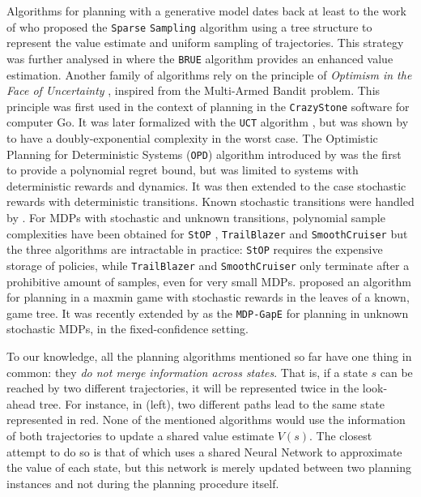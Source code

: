 \documentclass[runningheads]{llncs}
\begin{document}
Algorithms for planning with a generative model dates back at least to the work of \citet{Kearns02SS} who proposed the \texttt{Sparse} \texttt{Sampling} algorithm using a tree structure to represent the value estimate and uniform sampling of trajectories. This strategy was further analysed in \citep{Feldman14BRUE} where the \texttt{BRUE} algorithm provides an enhanced value estimation. Another family of algorithms rely on the principle of \emph{Optimism in the Face of Uncertainty} \citep[surveyed by][]{Munos14}, inspired from the Multi-Armed Bandit problem. This principle was first used in the context of planning in the \texttt{CrazyStone} software \citep{Coulom2006} for computer Go. It was later formalized with the \texttt{UCT} algorithm \citep{Kocsis06UCT}, but was shown by \citet{Coquelin2007} to have a doubly-exponential complexity in the worst case. The {Optimistic Planning for Deterministic Systems} (\texttt{OPD}) algorithm introduced by \citet{Hren2008optimistic} was the first to provide a polynomial regret bound, but was limited to systems with deterministic rewards and dynamics. It was then extended to the case stochastic rewards \citep{Bubeck2010open,Leurent2019practical} with deterministic transitions.
Known stochastic transitions were handled by \citet{Busoniu2012optimistic}. For MDPs with stochastic and unknown transitions, polynomial sample complexities have been obtained for \texttt{StOP} \citep{Szorenyi14}, \texttt{TrailBlazer} \citep{Grill16} and \texttt{SmoothCruiser} \citep{Grill19} but the three algorithms are intractable in practice: \texttt{StOP} requires the expensive storage of policies, while \texttt{TrailBlazer} and \texttt{SmoothCruiser} only terminate after a prohibitive amount of samples, even for very small MDPs. 
\citep{Kaufmann2017} proposed an algorithm for planning in a maxmin game with stochastic rewards in the leaves of a known, game tree. It was recently extended by \citet{MDPGapE2020} as the \texttt{MDP-GapE} for planning in unknown stochastic MDPs, in the fixed-confidence setting.

To our knowledge, all the planning algorithms mentioned so far have one thing in common: they \emph{do not merge information across states}. That is, if a state $s$ can be reached by two different trajectories, it will be represented twice in the look-ahead tree. For instance, in  (left), two different paths lead to the same state represented in red. None of the mentioned algorithms would use the information of both trajectories to update a shared value estimate $V(s)$. The closest attempt to do so is that of \citet{Silver18} which uses a shared Neural Network to approximate the value of each state, but this network is merely updated between two planning instances and not during the planning procedure itself.
\end{document}
